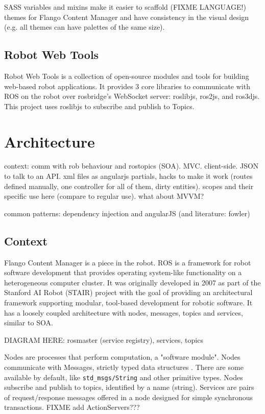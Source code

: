 SASS variables and mixins make it easier to scaffold (FIXME LANGUAGE!) themes for Flango Content Manager and have consistency in the visual design (e.g. all themes can have palettes of the same size).

\subsection{Robot Web Tools}
Robot Web Tools is a collection of open-source modules and tools for building web-based robot applications.
It provides 3 core libraries to communicate with \ac{ROS} on the robot over rosbridge's WebSocket server: roslibjs, ros2js, and ros3djs.
This project uses roslibjs to subscribe and publish to Topics.

\section{Architecture}
context: comm with rob behaviour and rostopics (SOA).
MVC. client-side. JSON to talk to an API. xml files as angularjs partials, hacks to make it work (routes defined manually, one controller for all of them, dirty entities). scopes and their specific use here (compare to regular use). what about MVVM?

common patterns:
dependency injection and angularJS (and literature: fowler)

\subsection{Context}
Flango Content Manager is a piece in the robot.
\ac{ROS} is a framework for robot software development that provides operating system-like functionality on a heterogeneous computer cluster. 
It was originally developed in 2007 as part of the Stanford AI Robot (STAIR) project with the goal of providing an architectural framework supporting modular, tool-based development for robotic software.
It has a loosely coupled architecture with nodes, messages, topics and services, similar to \ac{SOA}.

DIAGRAM HERE: rosmaster (service registry), services, topics

Nodes are processes that perform computation, a "software module". 
Nodes communicate with Messages, strictly typed data structures . There are some available by default, like \texttt{std\_msgs/String} and other primitive types.
Nodes subscribe and publish to topics, identified by a name (string).
Services are pairs of request/response messages offered in a node designed for simple synchronous transactions.
FIXME add ActionServers???


